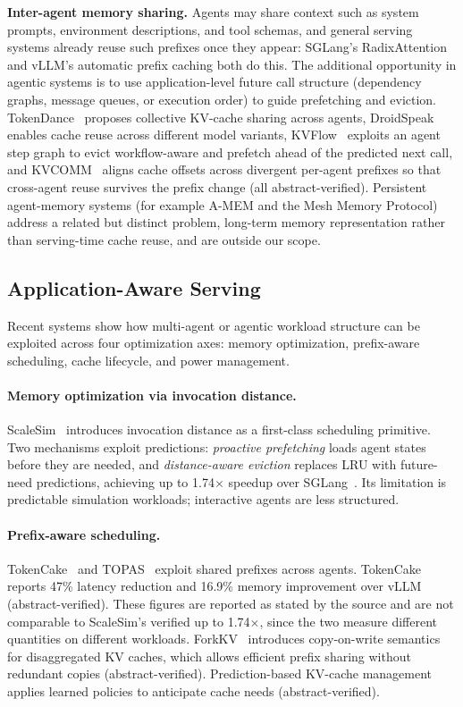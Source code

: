 \textbf{Inter-agent memory sharing.} Agents may share context such as system prompts, environment descriptions, and tool schemas, and general serving systems already reuse such prefixes once they appear: SGLang's RadixAttention and vLLM's automatic prefix caching both do this. The additional opportunity in agentic systems is to use application-level future call structure (dependency graphs, message queues, or execution order) to guide prefetching and eviction. TokenDance~\cite{tokendance2026} proposes collective KV-cache sharing across agents, DroidSpeak~\cite{droidspeak2024} enables cache reuse across different model variants, KVFlow~\cite{kvflow2025} exploits an agent step graph to evict workflow-aware and prefetch ahead of the predicted next call, and KVCOMM~\cite{kvcomm2025} aligns cache offsets across divergent per-agent prefixes so that cross-agent reuse survives the prefix change (all abstract-verified). Persistent agent-memory systems (for example A-MEM and the Mesh Memory Protocol) address a related but distinct problem, long-term memory representation rather than serving-time cache reuse, and are outside our scope.

\subsection{Application-Aware Serving}\label{sec:infra_scalesim}

Recent systems show how multi-agent or agentic workload structure can be exploited across four optimization axes: memory optimization, prefix-aware scheduling, cache lifecycle, and power management.

\paragraph*{Memory optimization via invocation distance.}
ScaleSim~\cite{zhou2026} introduces invocation distance as a first-class scheduling primitive. Two mechanisms exploit predictions: \emph{proactive prefetching} loads agent states before they are needed, and \emph{distance-aware eviction} replaces LRU with future-need predictions, achieving up to 1.74$\times$ speedup over SGLang~\cite{zhou2026}. Its limitation is predictable simulation workloads; interactive agents are less structured.

\paragraph*{Prefix-aware scheduling.}
TokenCake~\cite{tokencake2025} and TOPAS~\cite{topas2026} exploit shared prefixes across agents. TokenCake reports 47\% latency reduction and 16.9\% memory improvement over vLLM (abstract-verified). These figures are reported as stated by the source and are not comparable to ScaleSim's verified up to 1.74$\times$, since the two measure different quantities on different workloads. ForkKV~\cite{forkkv2026} introduces copy-on-write semantics for disaggregated KV caches, which allows efficient prefix sharing without redundant copies (abstract-verified). Prediction-based KV-cache management~\cite{predkvcache2026} applies learned policies to anticipate cache needs (abstract-verified).

